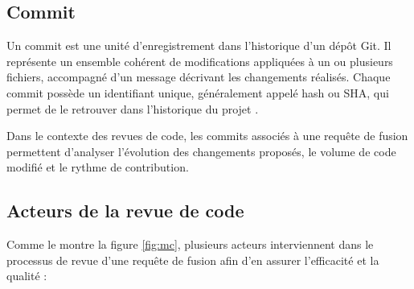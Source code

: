 \subsection{Commit}

Un commit est une unité d’enregistrement dans l’historique d’un dépôt Git. Il représente un ensemble cohérent de modifications appliquées à un ou plusieurs fichiers, accompagné d’un message décrivant les changements réalisés. Chaque commit possède un identifiant unique, généralement appelé hash ou SHA, qui permet de le retrouver dans l’historique du projet \cite{github_about_commits}.

Dans le contexte des revues de code, les commits associés à une requête de fusion permettent d’analyser l’évolution des changements proposés, le volume de code modifié et le rythme de contribution.




\subsection{Acteurs de la revue de code}

Comme le montre la figure \ref{fig:mc}, plusieurs acteurs interviennent dans le processus de revue d’une requête de fusion afin d’en assurer l’efficacité et la qualité :

